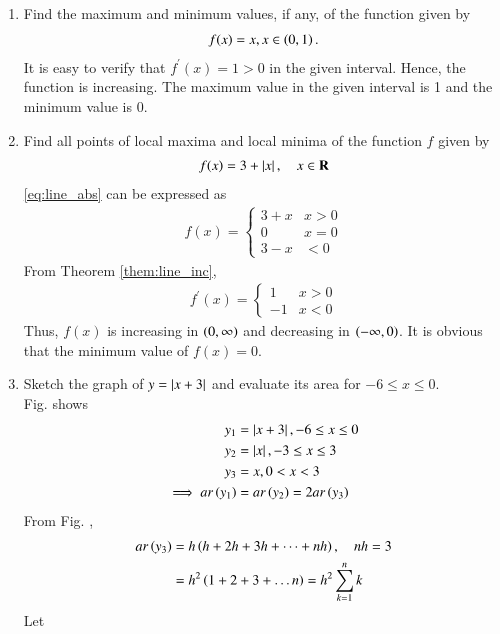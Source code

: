 \begin{enumerate}[label=\arabic*.,ref=\thesubsection.\theenumi]
\item Find the maximum and minimum values, if any, of the function given by 
%
\begin{align}
\label{eq:line_der_def_prob}
f(x) = x, x \in \left(0,1\right).
\end{align}
%
\solution It is easy to verify that $f^{\prime}(x) = 1 > 0$ in the given interval.    Hence, the function is increasing.   The maximum value in the given interval is 1 and the minimum value is 0.
%
\item Find all points of local maxima and local minima of the function $f$ given by 
%
\begin{align}
\label{eq:line_abs}
f(x)  = 3 +\left\vert x\right\vert, \quad x \in \mathbf{R}
\end{align}
%
\solution \eqref{eq:line_abs} can be expressed as 
%
\begin{align}
\label{eq:line_abs_cases}
f(x)  = 
\begin{cases}
3 +x & x > 0
\\
0 & x = 0
\\
3- x & < 0
\end{cases}
\end{align}
%
From Theorem \ref{them:line_inc}, 
%
\begin{align}
f^{\prime}(x)  = 
\begin{cases}
1 & x > 0
\\
-1 & x < 0
\end{cases}
\end{align}
%
Thus, $f(x)$ is increasing in $\left(0, \infty\right)$ and decreasing in $\left(-\infty, 0\right)$.  It is obvious that the minimum value of $f(x) = 0$.
%
\item Sketch the graph of $y = \left\vert x+3\right\vert$ and evaluate its area for $-6 \le x \le 0$.
\\
\solution Fig.  shows 
\begin{align}
\label{eq:tri_area_lim_abs}
y_1 &= \left\vert x+3\right\vert, -6 \le x \le 0
\\
y_2 &= \left\vert x\right\vert, -3 \le x \le 3
\\
y_3 &= x, 0 < x < 3
\\
\implies ar\left(y_1\right) &= ar\left(y_2\right) = 2ar\left(y_3\right)
\end{align}
From Fig. , 
%
\begin{align}
ar\left(y_3\right) &= h\left(h + 2h+ 3h + \dots + nh\right), \quad nh = 3
\\
&=h^2\left(1+2+3+\dots n\right)= h^2\sum_{k=1}^{n}k 
\label{eq:tri_area_lim}
\end{align}
%
Let 

\end{enumerate}
